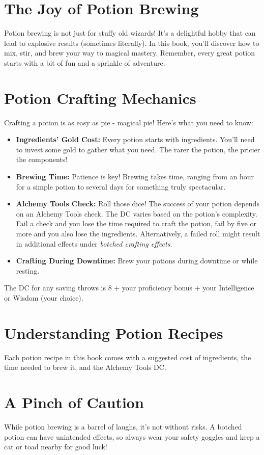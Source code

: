\documentclass[letterpaper,twocolumn,openany,nodeprecatedcode]{dndbook}
\begin{document}
\section{The Joy of Potion Brewing}
    Potion brewing is not just for stuffy old wizards! It's a delightful hobby that can lead to explosive results (sometimes literally). In this book, you'll discover how to mix, stir, and brew your way to magical mastery. Remember, every great potion starts with a bit of fun and a sprinkle of adventure.

\section{Potion Crafting Mechanics}
Crafting a potion is as easy as pie - magical pie! Here's what you need to know:
\begin{itemize}
  \item \textbf{Ingredients' Gold Cost:} Every potion starts with ingredients. You'll need to invest some gold to gather what you need. The rarer the potion, the pricier the components!
  \item \textbf{Brewing Time:} Patience is key! Brewing takes time, ranging from an hour for a simple potion to several days for something truly spectacular.
  \item \textbf{Alchemy Tools Check:} Roll those dice! The success of your potion depends on an Alchemy Tools check. The DC varies based on the potion's complexity. Fail a check and you lose the time required to craft the potion, fail by five or more and you also lose the ingredients. Alternatively, a failed roll might result in additional effects under \textit{botched crafting effects}.
  \item \textbf{Crafting During Downtime:} Brew your potions during downtime or while resting. 
\end{itemize}

The DC for any saving throws is 8 + your proficiency bonus + your Intelligence or Wisdom (your choice).

\section{Understanding Potion Recipes}
    Each potion recipe in this book comes with a suggested cost of ingredients, the time needed to brew it, and the Alchemy Tools DC. 

\section{A Pinch of Caution}
    While potion brewing is a barrel of laughs, it's not without risks. A botched potion can have unintended effects, so always wear your safety goggles and keep a cat or toad nearby for good luck!
\end{document}
